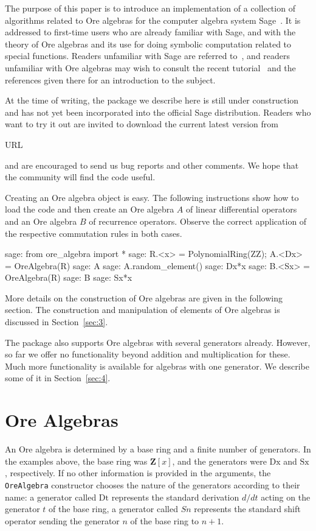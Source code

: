 \documentclass[11pt]{amsart}
\def\Bold#1{\mathbf{#1}}
\begin{document}
The purpose of this paper is to introduce an implementation of a collection of
algorithms related to Ore algebras for the computer algebra system
Sage~\cite{sage}. It is addressed to first-time users who are already familiar
with Sage, and with the theory of Ore algebras and its use for doing symbolic
computation related to special functions. Readers unfamiliar with Sage are referred
to~\cite{sage}, and readers unfamiliar with Ore algebras may wish to consult the
recent tutorial~\cite{kauers13} and the references given there for an introduction to
the subject.

At the time of writing, the package we describe here is still under construction
and has not yet been incorporated into the official Sage distribution. Readers
who want to try it out are invited to download the current latest version from 
\begin{center}
  URL
\end{center}
and are encouraged to send us bug reports and other comments. We hope 
that the community will find the code useful.

Creating an Ore algebra object is easy. The following instructions show how to 
load the code and then create an Ore algebra $A$ of linear differential operators
and an Ore algebra $B$ of recurrence operators. Observe the correct application
of the respective commutation rules in both cases. 

\begin{sageexample}
  sage: from ore_algebra import *
  sage: R.<x> = PolynomialRing(ZZ); A.<Dx> = OreAlgebra(R)
  sage: A
  sage: A.random_element()
  sage: Dx*x
  sage: B.<Sx> = OreAlgebra(R)
  sage: B
  sage: Sx*x
\end{sageexample}

More details on the construction of Ore algebras are given in the following
section. The construction and manipulation of elements of Ore algebras is
discussed in Section~\ref{sec:3}.

The package also supports Ore algebras with several generators already. However,
so far we offer no functionality beyond addition and multiplication for
these. Much more functionality is available for algebras with one generator. We
describe some of it in Section~\ref{sec:4}. 

\section{Ore Algebras}

An Ore algebra is determined by a base ring and a finite number of generators.
In the examples above, the base ring was $\Bold{Z}[x]$, and the generators were
$\mathrm{Dx}$ and $\mathrm{Sx}$, respectively. If no other information is provided
in the arguments, the \verb|OreAlgebra| constructor chooses the nature of the 
generators according to their name: a generator called $\mathrm{Dt}$ represents
the standard derivation $d/dt$ acting on the generator $t$ of the base ring, 
a generator called $Sn$ represents the standard shift operator sending the
generator $n$ of the base ring to $n+1$. 
\end{document}
